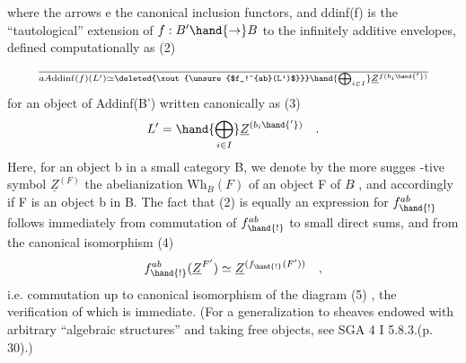 
where the  arrows e the canonical inclusion functors, and
ddinf(f) is the ``tautological'' extension of $f:B'\hand{\to} B$ to the infinitely
additive envelopes, defined computationally as
(2) \[ \over{a}{A}\mathrm{ddinf}(f)(L') \simeq \deleted{\xout{\unsure{$f_!^{ab}(L')$}}} \hand{\bigoplus_{i\in I}} \underline{Z}^{f(b_i\hand{'})} \]
for an object of Addinf(B') written canonically as
(3) \[ L' = \hand{\bigoplus_{i\in I}} \underline{Z}^{(b_i\hand{'})} \quad . \]
Here, for an object b in a small category B, we denote by the more sugges%
-tive symbol $\underline{Z}^{(F)}$ the abelianization $\mathrm{Wh}_B(F)$ of an object F of $B\hat{}$ , and
accordingly if F is an object b in B. The fact that (2) is equally an
expression for $f_{\hand{!}}^{ab}$ follows immediately from commutation of $f_{\hand{!}}^{ab}$ to small
direct sums, and from the canonical isomorphism
(4) \[ f_{\hand{!}}^{ab}(\underline{Z}^{F'}) \simeq \underline{Z}^{(f_{\hand{!}}(F'))} \quad , \]
i.e. commutation up to canonical isomorphism of the diagram
(5)  ,
the verification of which is immediate. (For a generalization to sheaves
endowed with arbitrary ``algebraic structures'' and taking free objects,
see SGA 4 I 5.8.3.(p. 30).)

